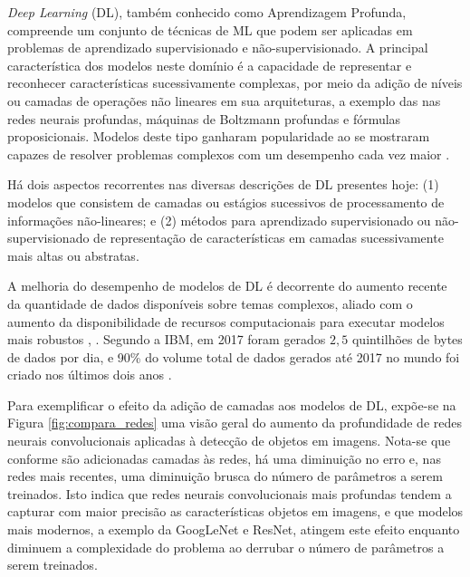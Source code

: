
\emph{Deep Learning} (DL), também conhecido como Aprendizagem Profunda, compreende um conjunto de técnicas de ML que podem ser aplicadas em problemas de aprendizado supervisionado e não-supervisionado. A principal característica dos modelos neste domínio é a capacidade de representar e reconhecer características sucessivamente complexas, por meio da adição de níveis ou camadas de operações não lineares em sua arquiteturas, a exemplo das nas redes neurais profundas, máquinas de Boltzmann profundas e fórmulas proposicionais. Modelos deste tipo ganharam popularidade ao se mostraram capazes de resolver problemas complexos com um desempenho cada vez maior \cite{bengio2009learning}.

Há dois aspectos recorrentes nas diversas descrições de DL presentes hoje: (1) modelos que consistem de camadas ou estágios sucessivos de processamento de informações não-lineares; e (2) métodos para aprendizado supervisionado ou não-supervisionado de representação de características em camadas sucessivamente mais altas ou abstratas.

A melhoria do desempenho de modelos de DL é decorrente do aumento recente da quantidade de dados disponíveis sobre temas complexos, aliado com o aumento da disponibilidade de recursos computacionais para executar modelos mais robustos \cite{goodfellow2016deep}, \cite{deng2014deep}. Segundo a IBM, em 2017 foram gerados $2,5$ quintilhões de bytes de dados por dia, e 90\% do volume total de dados gerados até 2017 no mundo foi criado nos últimos dois anos \cite{ibm2017bigdata}.

Para exemplificar o efeito da adição de camadas aos modelos de DL, expõe-se na Figura \ref{fig:compara_redes} uma visão geral do aumento da profundidade de redes neurais convolucionais aplicadas à detecção de objetos em imagens. Nota-se que conforme são adicionadas camadas às redes, há uma diminuição no erro e, nas redes mais recentes, uma diminuição brusca do número de parâmetros a serem treinados. Isto indica que redes neurais convolucionais mais profundas tendem a capturar com maior precisão as características objetos em imagens, e que modelos mais modernos, a exemplo da GoogLeNet e ResNet, atingem este efeito enquanto diminuem a complexidade do problema ao derrubar o número de parâmetros a serem treinados.

